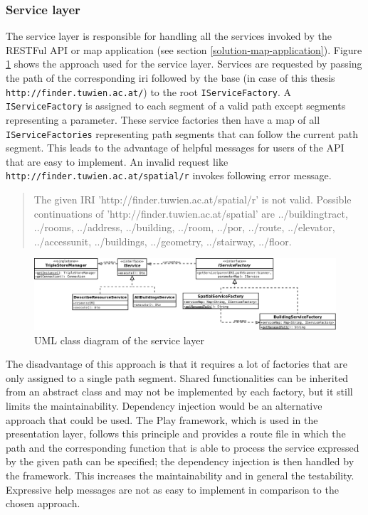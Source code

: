 \documentclass[draft,final]{vutinfth} %
\begin{document}
\subsubsection{Service layer}
The service layer is responsible for handling all the services invoked by the RESTFul API or map application (see section \ref{solution-map-application}). Figure \ref{fig:solution-architectural-prototype:service-layer-uml} shows the approach used for the service layer. Services are requested by passing the path of the corresponding \gls{iri} followed by the base (in case of this thesis \texttt{http://finder.tuwien.ac.at/}) to the root \texttt{IServiceFactory}. A \texttt{IServiceFactory} is assigned to each segment of a valid path except segments representing a parameter. These service factories then have a map of all \texttt{IServiceFactories} representing path segments that can follow the current path segment. This leads to the advantage of helpful messages for users of the API that are easy to implement. An invalid request like \texttt{http://finder.tuwien.ac.at/spatial/r} invokes following error message.

\begin{quote}
The given IRI 'http://finder.tuwien.ac.at/spatial/r' is not valid. Possible continuations of 'http://finder.tuwien.ac.at/spatial' are ../buildingtract, ../rooms, ../address, ../building, ../room, ../por, ../route, ../elevator, ../accessunit, ../buildings, ../geometry, ../stairway, ../floor.
\end{quote}

\begin{figure}[h]
    \centering
    \includegraphics[width=1.0\textwidth]{graphics/solution/architecture/servicelayer_factories.png}
    \caption{UML class diagram of the service layer}
    \label{fig:solution-architectural-prototype:service-layer-uml}
\end{figure}

The disadvantage of this approach is that it requires a lot of factories that are only assigned to a single path segment. Shared functionalities can be inherited from an abstract class and may not be implemented by each factory, but it still limits the maintainability. Dependency injection would be an alternative approach that could be used. The Play framework, which is used in the presentation layer, follows this principle and provides a route file in which the path and the corresponding function that is able to process the service expressed by the given path can be specified; the dependency injection is then handled by the framework. This increases the maintainability and in general the testability. Expressive help messages are not as easy to implement in comparison to the chosen approach. 
\end{document}
